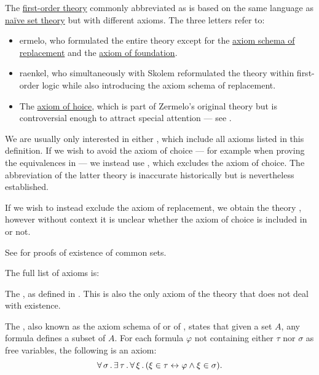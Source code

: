 \begin{definition}\label{def:zfc}
  The \hyperref[def:first_order_theory]{first-order theory} commonly abbreviated as  is based on the same language as \hyperref[def:naive_set_theory]{na\"ive set theory} but with different axioms. The three letters refer to:
  \begin{itemize}
    \item {}ermelo, who formulated the entire theory except for the \hyperref[def:zfc/replacement]{axiom schema of replacement} and the \hyperref[def:zfc/foundation]{axiom of foundation}.
    \item{} raenkel, who simultaneously with Skolem reformulated the theory within first-order logic while also introducing the axiom schema of replacement.
    \item The \hyperref[def:zfc/choice]{axiom of hoice}, which is part of Zermelo's original theory but is controversial enough to attract special attention --- see .
  \end{itemize}

  We are usually only interested in either , which include all axioms listed in this definition. If we wish to avoid the axiom of choice --- for example when proving the equivalences in  --- we instead use , which excludes the axiom of choice. The abbreviation of the latter theory is inaccurate historically but is nevertheless established.

  If we wish to instead exclude the axiom of replacement, we obtain the theory , however without context it is unclear whether the axiom of choice is included in  or not.

  See  for proofs of existence of common sets.

  The full list of axioms is:
  \begin{thmenum}
     The , as defined in . This is also the only axiom of the theory that does not deal with existence.

     The , also known as the axiom schema of  or of , states that given a set \( A \), any formula defines a subset of \( A \). For each formula \( \varphi \) not containing either \( \tau \) nor \( \sigma \) as free variables, the following is an axiom:
    \begin{equation}\label{eq:def:zfc/specification}
      \forall \thinspace \sigma \thinspace . \thinspace \exists \thinspace \tau \thinspace . \thinspace \forall \thinspace \xi \thinspace . \thinspace (\xi \in \tau \leftrightarrow \varphi \wedge \xi \in \sigma).
    \end{equation}


\end{thmenum}
\end{definition}

